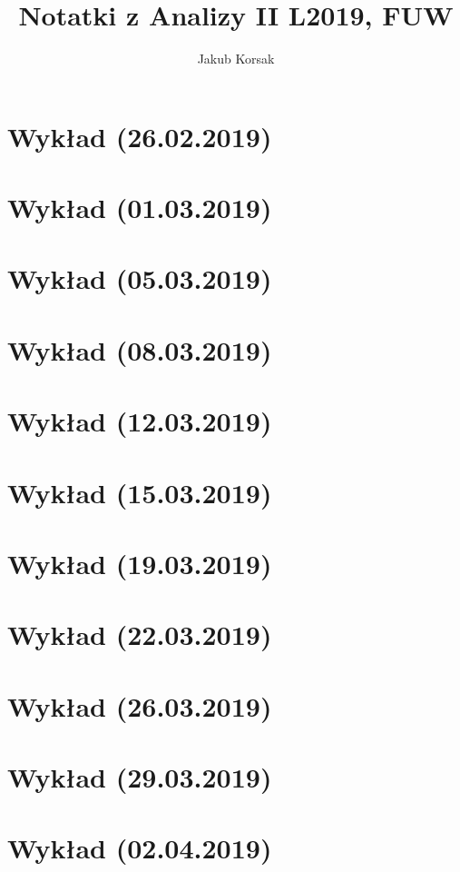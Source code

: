 \documentclass{article}
\title{Notatki z Analizy II L2019, FUW}
\author{Jakub Korsak}
\begin{document}
\maketitle

\pagebreak
\section{Wykład (26.02.2019)}

\pagebreak
\section{Wykład (01.03.2019)}

\pagebreak
\section{Wykład (05.03.2019)}

\pagebreak
\section{Wykład (08.03.2019)}

\pagebreak
\section{Wykład (12.03.2019)}

\pagebreak
\section{Wykład (15.03.2019)}

\pagebreak
\section{Wykład (19.03.2019)}

\pagebreak
\section{Wykład (22.03.2019)}

\pagebreak
\section{Wykład (26.03.2019)}

\pagebreak
\section{Wykład (29.03.2019)}

\pagebreak
\section{Wykład (02.04.2019)}

\pagebreak
\end{document}
